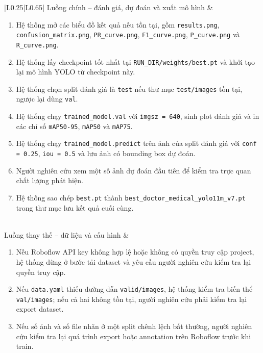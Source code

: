 \begin{longtable}{|L{0.25\textwidth}|L{0.65\textwidth}|}
Luồng chính -- đánh giá, dự đoán và xuất mô hình &
\begin{minipage}[t]{\linewidth}
\begin{enumerate}[label=\textbf{Bước \arabic*:}, leftmargin=1.55cm, itemsep=0pt, topsep=0pt]
    \item Hệ thống mở các biểu đồ kết quả nếu tồn tại, gồm \texttt{results.png}, \texttt{confusion\_matrix.png}, \texttt{PR\_curve.png}, \texttt{F1\_curve.png}, \texttt{P\_curve.png} và \texttt{R\_curve.png}.
    \item Hệ thống lấy checkpoint tốt nhất tại \texttt{RUN\_DIR/weights/best.pt} và khởi tạo lại mô hình YOLO từ checkpoint này.
    \item Hệ thống chọn split đánh giá là \texttt{test} nếu thư mục \texttt{test/images} tồn tại, ngược lại dùng \texttt{val}.
    \item Hệ thống chạy \texttt{trained\_model.val} với \texttt{imgsz = 640}, sinh plot đánh giá và in các chỉ số \texttt{mAP50-95}, \texttt{mAP50} và \texttt{mAP75}.
    \item Hệ thống chạy \texttt{trained\_model.predict} trên ảnh của split đánh giá với \texttt{conf = 0.25}, \texttt{iou = 0.5} và lưu ảnh có bounding box dự đoán.
    \item Người nghiên cứu xem một số ảnh dự đoán đầu tiên để kiểm tra trực quan chất lượng phát hiện.
    \item Hệ thống sao chép \texttt{best.pt} thành \texttt{best\_doctor\_medical\_yolo11m\_v7.pt} trong thư mục lưu kết quả cuối cùng.
\end{enumerate}
\end{minipage} \\ \hline
Luồng thay thế -- dữ liệu và cấu hình &
\begin{minipage}[t]{\linewidth}
\begin{enumerate}[label=\textbf{Bước \arabic*:}, leftmargin=1.55cm, itemsep=0pt, topsep=0pt]
    \item Nếu Roboflow API key không hợp lệ hoặc không có quyền truy cập project, hệ thống dừng ở bước tải dataset và yêu cầu người nghiên cứu kiểm tra lại quyền truy cập.
    \item Nếu \texttt{data.yaml} thiếu đường dẫn \texttt{valid/images}, hệ thống kiểm tra biến thể \texttt{val/images}; nếu cả hai không tồn tại, người nghiên cứu phải kiểm tra lại export dataset.
    \item Nếu số ảnh và số file nhãn ở một split chênh lệch bất thường, người nghiên cứu kiểm tra lại quá trình export hoặc annotation trên Roboflow trước khi train.

\end{enumerate}
\end{minipage}
\end{longtable}
